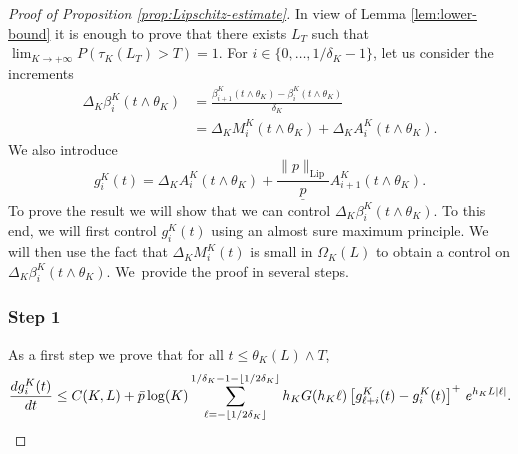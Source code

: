 \documentclass[JEP,XML,SOM,Unicode,published]{cedram}
\theoremstyle{plain}
\theoremstyle{remark}
\begin{document}
\begin{proof}[Proof of Proposition \ref{prop:Lipschitz-estimate}]
In view of Lemma \ref{lem:lower-bound} it is enough to prove that there exists $L_T$ such that
$\lim_{K\to +\infty} P(\tau_K(L_T)>T)=1$. For $i\in\{0,\ldots,1/\delta_K-1\}$, let us consider the increments\vspace*{-3pt}\enlargethispage{\baselineskip}
\begin{align*}
\Delta_K\beta^K_{i}(t\wedge \theta_K)&= \frac{\beta_{i+1}^K(t\wedge \theta_K)-\beta_{i}^K(t\wedge \theta_K)}{\delta_K}\\
&= \Delta_KM^K_{i}(t\wedge \theta_K) + \Delta_KA^K_{i}(t\wedge \theta_K).
\end{align*}
We also introduce\vspace*{-3pt}
\begin{equation}
\label{def:g}
g^K_{i}(t)=\Delta_K A^K_{i}(t\wedge \theta_K)+\frac{\|p\|_{\text{Lip}}}{\underline p} A^K_{i+1}(t\wedge\theta_K).
\end{equation}
To prove the result we will show that we can control $\Delta_K\beta^K_{i}(t\wedge \theta_K)$. To this end, we will first control $g_i^K(t)$ using an almost sure maximum principle. We will then use the fact that $\Delta_K M^K_{i}(t)$ is small in $\Omega_K(L)$ to obtain a control on $\Delta_K\beta^K_{i}(t\wedge \theta_K)$. We~provide the proof in several steps.

\subsubsection*{Step 1} As a first step we prove that for all $t\leq\theta_K(L)\wedge T$,\vspace*{-3pt}
\[
{d g^K_{i}(t)\over dt} \le C(K,L)
+ \bar p \log(K)\sum_{\ell=-\lfloor 1/2\delta_K\rfloor}^{1/\delta_K-1-\lfloor 1/2\delta_K\rfloor}
h_{K} G(h_{K}\ell) \left[g^K_{\ell+i}(t) - g^K_{i}(t)\right]^+ \, e^{h_{K}L|\ell|}.
\]


\end{proof}
\end{document}
